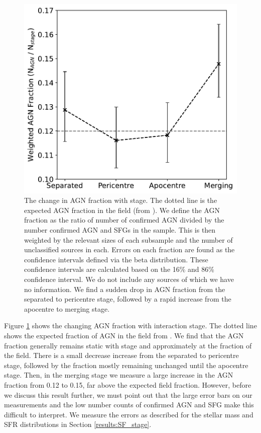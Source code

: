 \begin{figure}
    \centering
    \includegraphics[width=\textwidth]{Chapter3/figures/agn-frac-time.pdf}
    \caption[The change in AGN fraction with stage.]{The change in AGN fraction with stage. The dotted line is the expected AGN fraction in the field (from \citet{2008AJ....135.1877E}). We define the AGN fraction as the ratio of number of confirmed AGN divided by the number confirmed AGN and SFGs in the sample. This is then weighted by the relevant sizes of each subsample and the number of unclassified sources in each. Errors on each fraction are found as the confidence intervals defined via the beta distribution. These confidence intervals are calculated based on the 16\% and 86\% confidence interval. We do not include any sources of which we have no information. We find a sudden drop in AGN fraction from the separated to pericentre stage, followed by a rapid increase from the apocentre to merging stage.}
    \label{fig:agn-frac-time}
\end{figure}

Figure \ref{fig:agn-frac-time} shows the changing AGN fraction with interaction stage. The dotted line shows the expected fraction of AGN in the field from \citet{2008AJ....135.1877E}. We find that the AGN fraction generally remains static with stage and approximately at the fraction of the field. There is a small decrease increase from the separated to pericentre stage, followed by the fraction mostly remaining unchanged until the apocentre stage. Then, in the merging stage we measure a large increase in the AGN fraction from 0.12 to 0.15, far above the expected field fraction. However, before we discuss this result further, we must point out that the large error bars on our measurements and the low number counts of confirmed AGN and SFG make this difficult to interpret. We measure the errors as described for the stellar mass and SFR distributions in Section \ref{results:SF_stage}. 

